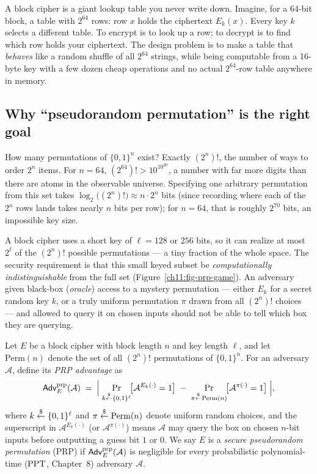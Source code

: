 \begin{intuitionbox}
A block cipher is a giant lookup table you never write down. Imagine, for a 64-bit block, a table with $2^{64}$ rows: row $x$ holds the ciphertext $E_k(x)$. Every key $k$ selects a different table. To encrypt is to look up a row; to decrypt is to find which row holds your ciphertext. The design problem is to make a table that \emph{behaves} like a random shuffle of all $2^{64}$ strings, while being computable from a 16-byte key with a few dozen cheap operations and no actual $2^{64}$-row table anywhere in memory.
\end{intuitionbox}

\subsection{Why ``pseudorandom permutation'' is the right goal}

How many permutations of $\{0,1\}^n$ exist? Exactly $(2^n)!$, the number of ways to order $2^n$ items. For $n = 64$, $(2^{64})! > 10^{10^{20}}$, a number with far more digits than there are atoms in the observable universe. Specifying one arbitrary permutation from this set takes $\log_2\!\bigl((2^n)!\bigr) \approx n \cdot 2^n$ bits (since recording where each of the $2^n$ rows lands takes nearly $n$ bits per row); for $n = 64$, that is roughly $2^{70}$ bits, an impossible key size.

A block cipher uses a short key of $\ell = 128$ or $256$ bits, so it can realize at most $2^{\ell}$ of the $(2^n)!$ possible permutations --- a tiny fraction of the whole space. The security requirement is that this small keyed subset be \emph{computationally indistinguishable} from the full set (Figure~\ref{ch11:fig-prp-game}). An adversary given black-box (\emph{oracle}) access to a mystery permutation --- either $E_k$ for a secret random key $k$, or a truly uniform permutation $\pi$ drawn from all $(2^n)!$ choices --- and allowed to query it on chosen inputs should not be able to tell which box they are querying.

\begin{definition}
\label{ch11:def-prp}
Let $E$ be a block cipher with block length $n$ and key length $\ell$, and let $\mathrm{Perm}(n)$ denote the set of all $(2^n)!$ permutations of $\{0,1\}^n$. For an adversary $\mathcal{A}$, define its \emph{PRP advantage} as
\[
\mathsf{Adv}^{\mathrm{prp}}_{E}(\mathcal{A}) \;=\;
\Bigl|\;
\Pr_{k \stackrel{\$}{\gets} \{0,1\}^\ell}\!\bigl[\mathcal{A}^{E_k(\cdot)} = 1\bigr]
\;-\;
\Pr_{\pi \stackrel{\$}{\gets} \mathrm{Perm}(n)}\!\bigl[\mathcal{A}^{\pi(\cdot)} = 1\bigr]
\;\Bigr|,
\]
where $k \stackrel{\$}{\gets} \{0,1\}^{\ell}$ and $\pi \stackrel{\$}{\gets} \mathrm{Perm}(n)$ denote uniform random choices, and the superscript in $\mathcal{A}^{E_k(\cdot)}$ (or $\mathcal{A}^{\pi(\cdot)}$) means $\mathcal{A}$ may query the box on chosen $n$-bit inputs before outputting a guess bit $1$ or $0$. We say $E$ is a \emph{secure pseudorandom permutation} (PRP) if $\mathsf{Adv}^{\mathrm{prp}}_{E}(\mathcal{A})$ is negligible for every probabilistic polynomial-time ($\mathrm{PPT}$, Chapter~8) adversary $\mathcal{A}$.
\end{definition}

